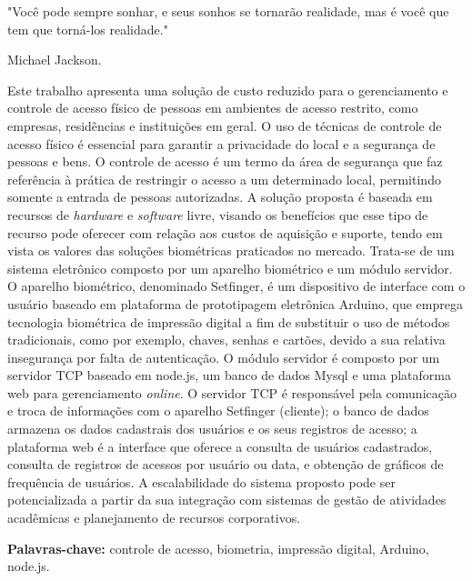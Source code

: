 \documentclass{./template/ufpatccdoisautores}
\begin{document}

\begin{ufpaEpigrafe}
"Você pode sempre sonhar, e seus sonhos se tornarão realidade, mas é você que tem que torná-los realidade."\\
\begin{flushright}Michael Jackson.\end{flushright}
\end{ufpaEpigrafe}

\begin{ufpaResumo}


Este trabalho apresenta uma solução de custo reduzido para o gerenciamento e controle de acesso físico de pessoas em ambientes de acesso restrito, como empresas, residências e ins\-ti\-tui\-ções em geral. O uso de técnicas de controle de acesso físico é essencial para garantir a privacidade do local e a segurança de pessoas e bens. O controle de acesso  é um termo da área de segurança que faz referência à prática de restringir o acesso a um determinado local, permitindo somente a entrada de pessoas autorizadas. A solução proposta é baseada em recursos de \textit{hardware} e \textit{software} livre, visando os benefícios que esse tipo de recurso pode oferecer com relação aos custos de aquisição e suporte, tendo em vista os valores das soluções biométricas praticados no mercado. Trata-se de um sistema eletrônico composto por um aparelho biométrico e um módulo servidor. O aparelho biométrico, denominado Setfinger, é um dispositivo de interface com o usuário baseado em plataforma de prototipagem eletrônica Arduino, que emprega tecnologia biométrica de impressão digital a fim de substituir o uso de métodos tradicionais, como por exemplo, chaves, senhas e cartões, devido a sua relativa insegurança por falta de autenticação. O módulo servidor é composto por um servidor TCP baseado em node.js, um banco de dados Mysql e uma plataforma web para gerenciamento \textit{online}. O servidor TCP é responsável pela comunicação e troca de informações com o aparelho Setfinger (cliente); o banco de dados armazena os dados cadastrais dos usuários e os seus registros de acesso; a plataforma web é a interface que oferece a consulta de usuários cadastrados, consulta de registros de acessos por usuário ou data, e obtenção de gráficos de frequência de usuários. A escalabilidade do sistema proposto pode ser potencializada a partir da sua integração com sistemas de gestão de atividades acadêmicas e planejamento de recursos corporativos.


\textbf{Palavras-chave:} controle de acesso, biometria, impressão digital, Arduino, node.js.
 
\end{ufpaResumo}
\end{document}
